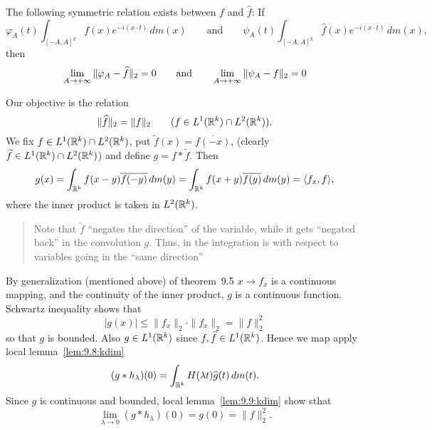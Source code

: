\begin{enumerate}
\begin{llem}
\begin{itemize}
The following symmetric relation exists between $f$ and \(\widehat{f}\):
If
\begin{equation*}
\varphi_A(t) \int_{[-A,A]^k} f(x)e^{-i(x\cdot t)}\,dm(x)
\qquad \textrm{and} \qquad
\psi_A(t) \int_{[-A,A]^k} \widehat{f}(x)e^{-i(x\cdot t)}\,dm(x),
\end{equation*}
then
\begin{equation*}
\lim_{A\to+\infty} \|\varphi_A - \widehat{f}\|_2 = 0 \\
\qquad \textrm{and} \qquad
\lim_{A\to+\infty} \|\psi_A - f\|_2 = 0
\end{equation*}
\end{itemize}
\end{llem}
\begin{thmproof}
Our objective is the relation
\begin{equation} \label{eq:plancherel:iso:kdim}
\|\widehat{f}\|_2 = \|f\|_2 \qquad (f\in L^1(\mathbb{R}^k)\cap L^2(\mathbb{R}^k)).
\end{equation}
We fix \(f\in L^1(\mathbb{R}^k)\cap L^2(\mathbb{R}^k)\), 
put \(\widetilde{f}(x) = \overline{f(-x)}\),
(clearly \(\widetilde{f} \in L^1(\mathbb{R}^k)\cap L^2(\mathbb{R}^k)\))
and define \(g = f \ast \widetilde{f}\). Then
\begin{equation*}
g(x) 
= \int_{\mathbb{R}^k} f(x-y)\overline{f(-y)}\,dm(y)
= \int_{\mathbb{R}^k} f(x+y)\overline{f(y)}\,dm(y)
= \langle f_x, f \rangle,
\end{equation*}
where the inner product is taken in \(L^2(\mathbb{R}^k)\).

\begin{quotation}
Note that \(\widetilde{f}\) ``negates the direction'' of the variable,
while it gets ``negated back'' in the convolution $g$.
Thus, in the integration is with respect to variables going
in the ``same direction''
\end{quotation}

By generalization (mentioned above) of theorem~9.5 
\(x\to f_x\) is a continuous mapping, and the continuity of 
the inner product, $g$ is a continuous function.
Schwartz inequality shows that
\begin{equation*}
|g(x)| \leq \|f_x\|_2\cdot \|f_x\|_2 =  \|f\|_2^2
\end{equation*}
so that $g$ is bounded. Also \(g\in L^1(\mathbb{R}^k)\) since
\(f,\widetilde{f}\in L^1(\mathbb{R}^k)\).
Hence we map apply local lemma~\ref{lem:9.8:kdim} 
\begin{equation} \label{eq:gconvh0}
(g\ast h_\lambda)(0) 
= \int_{\mathbb{R}^k} H(\lambda t) \widehat{g}(t)\,dm(t).
\end{equation}
Since $g$ is continuous and bounded, local lemma~\ref{lem:9.9:kdim}
show sthat
\begin{equation} \label{eq:lim-gconvh0}
\lim_{\lambda\to 0} (g \ast h_\lambda)(0) = g(0) = \|f\|_2^2.
\end{equation} 



\end{thmproof}
\end{enumerate}
